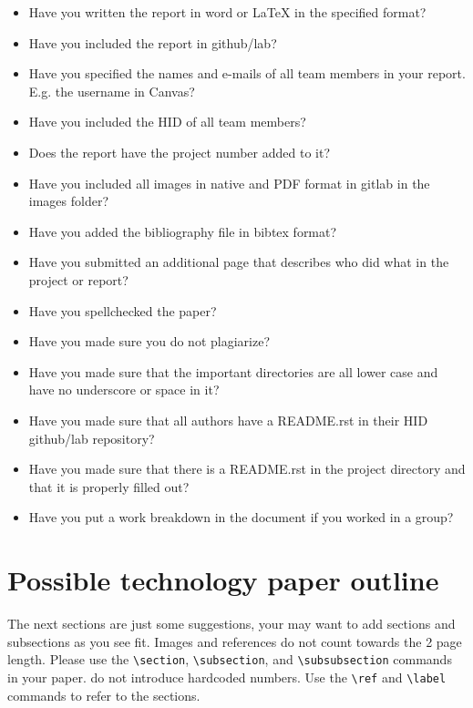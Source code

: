 \documentclass[9pt,twocolumn,twoside]{styles/osajnl}
\begin{document}
\begin{itemize}
\renewcommand{\labelitemi}{\scriptsize$\square$} 
\item Have you written the report in word or LaTeX in the specified
  format?
\item Have you included the report in github/lab?
\item Have you specified the names and e-mails of all team members in
  your report. E.g. the username in Canvas?
\item Have you included the HID of all team members?
\item Does the report have the project number added to it?
\item Have you included all images in native and PDF format in gitlab
  in the images folder?
\item Have you added the bibliography file in bibtex format?
\item Have you submitted an additional page that describes who did
  what in the project or report?
\item Have you spellchecked the paper?
\item Have you made sure you do not plagiarize?
\item Have you made sure that the important directories are all lower
  case and have no underscore or space in it?
\item Have you made sure that all authors have a README.rst in their
  HID github/lab repository?
\item Have you made sure that there is a README.rst in the project
  directory and that it is properly filled out?
\item Have you put a work breakdown in the document if you worked in a
  group?
\end{itemize}

\section{Possible technology paper outline}

The next sections are just some suggestions, your may want to add
sections and subsections as you see fit. Images and references do not
count towards the 2 page length. Please use the \verb|\section|,
\verb|\subsection|, and \verb|\subsubsection| commands in your
paper. do not introduce hardcoded numbers. Use the \verb|\ref| and
\verb|\label| commands to refer
 to the sections.
\end{document}
